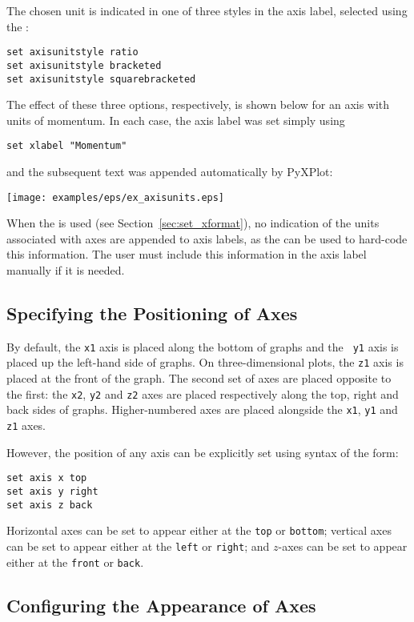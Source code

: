 The chosen unit is indicated in one of three styles in the axis label, selected
using the :
\begin{verbatim}
set axisunitstyle ratio
set axisunitstyle bracketed
set axisunitstyle squarebracketed
\end{verbatim}
The effect of these three options, respectively, is shown below for an axis
with units of momentum. In each case, the axis label was set simply using
\begin{verbatim}
set xlabel "Momentum"
\end{verbatim}
and the subsequent text was appended automatically by PyXPlot:

\vspace{3mm}
\centerline{\texttt{[image: examples/eps/ex\_axisunits.eps]}}
\vspace{3mm}

When the  is used (see Section~\ref{sec:set_xformat}), no
indication of the units associated with axes are appended to axis labels, as
the  can be used to hard-code this information. The user
must include this information in the axis label manually if it is needed.

\subsection{Specifying the Positioning of Axes}

By default, the {\tt x1} axis is placed along the bottom of graphs and the {\tt
y1} axis is placed up the left-hand side of graphs. On three-dimensional plots,
the {\tt z1} axis is placed at the front of the graph. The second set of axes
are placed opposite to the first: the {\tt x2}, {\tt y2} and {\tt z2} axes are
placed respectively along the top, right and back sides of graphs.
Higher-numbered axes are placed alongside the {\tt x1}, {\tt y1} and {\tt z1}
axes.

However, the position of any axis can be explicitly set using syntax of the
form:
\begin{verbatim}
set axis x top
set axis y right
set axis z back
\end{verbatim}
Horizontal axes can be set to appear either at the {\tt top} or {\tt bottom};
vertical axes can be set to appear either at the {\tt left} or {\tt right}; and
$z$-axes can be set to appear either at the {\tt front} or {\tt back}.

\subsection{Configuring the Appearance of Axes}

